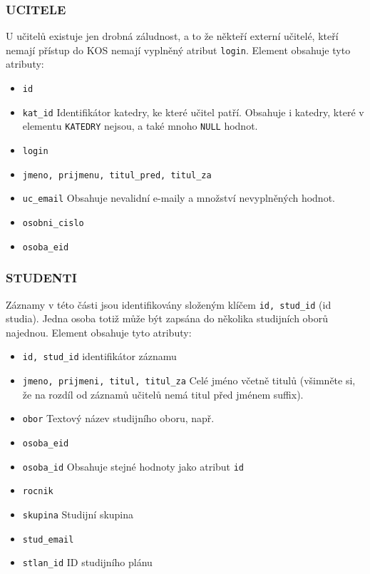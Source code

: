 \documentclass[11pt,twoside,a4paper]{book}
\begin{document}
\subsubsection{UCITELE}
U učitelů existuje jen drobná záludnost, a to že někteří externí učitelé, kteří nemají přístup do KOS nemají vyplněný atribut \texttt{login}. Element obsahuje tyto atributy:
\begin{itemize}
\item \texttt{id}
\item \texttt{kat\_id} Identifikátor katedry, ke které učitel patří. Obsahuje i katedry, které v elementu \texttt{KATEDRY} nejsou, a také mnoho \texttt{NULL} hodnot.
\item \texttt{login}
\item \texttt{jmeno, prijmenu, titul\_pred, titul\_za}
\item \texttt{uc\_email} Obsahuje nevalidní e-maily a množství nevyplněných hodnot.
\item \texttt{osobni\_cislo}
\item \texttt{osoba\_eid}
\end{itemize}

\subsubsection{STUDENTI}
Záznamy v této části jsou identifikovány složeným klíčem \texttt{id, stud\_id} (id studia). Jedna osoba totiž může být zapsána do několika studijních oborů najednou.
Element obsahuje tyto atributy:

\begin{itemize}
\item \texttt{id, stud\_id} identifikátor záznamu
\item \texttt{jmeno, prijmeni, titul, titul\_za} Celé jméno včetně titulů (všimněte si, že na rozdíl od záznamů učitelů nemá titul před jménem suffix).
\item \texttt{obor} Textový název studijního oboru, např. 
\item \texttt{osoba\_eid}
\item \texttt{osoba\_id} Obsahuje stejné hodnoty jako atribut \texttt{id}
\item \texttt{rocnik}
\item \texttt{skupina} Studijní skupina
\item \texttt{stud\_email}
\item \texttt{stlan\_id} ID studijního plánu
\end{itemize}
\end{document}
